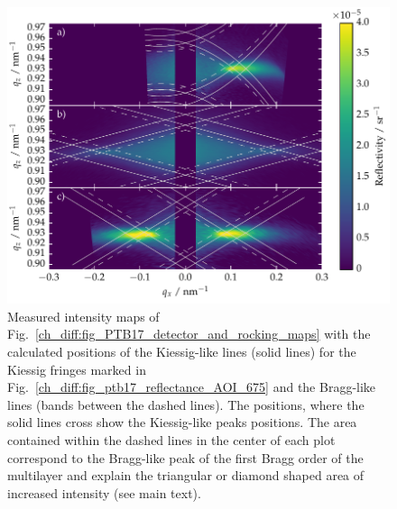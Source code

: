 \begin{figure}[htbp]
        \includegraphics[width=\textwidth]{img/kiessig_like_peaks_diffuse_map} \caption{Measured intensity maps of Fig.~\ref{ch_diff:fig_PTB17_detector_and_rocking_maps} with the calculated positions of the Kiessig-like lines (solid lines) for the Kiessig fringes marked in Fig.~\ref{ch_diff:fig_ptb17_reflectance_AOI_675} and the Bragg-like lines (bands between the dashed lines). The positions, where the solid lines cross show the Kiessig-like peaks positions. The area contained within the dashed lines in the center of each plot correspond to the Bragg-like peak of the first Bragg order of the multilayer and explain the triangular or diamond shaped area of increased intensity (see main text).} \label{ch_diff:fig_kiessig_like_peaks_diffuse_map} 
\end{figure}

